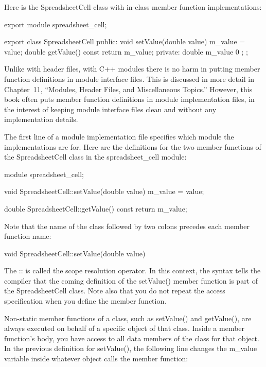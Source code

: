 Here is the SpreadsheetCell class with in-class member function implementations:

\begin{cpp}
export module spreadsheet_cell;

export class SpreadsheetCell
{
    public:
        void setValue(double value) { m_value = value; }
        double getValue() const { return m_value; }
    private:
        double m_value { 0 };
};
\end{cpp}

Unlike with header files, with C++ modules there is no harm in putting member function definitions in module interface files. This is discussed in more detail in Chapter 11, “Modules, Header Files, and Miscellaneous Topics.” However, this book often puts member function definitions in module implementation files, in the interest of keeping module interface files clean and without any implementation details.

The first line of a module implementation file specifies which module the implementations are for. Here are the definitions for the two member functions of the SpreadsheetCell class in the spreadsheet\_cell module:

\begin{cpp}
module spreadsheet_cell;

void SpreadsheetCell::setValue(double value)
{
    m_value = value;
}

double SpreadsheetCell::getValue() const
{
    return m_value;
}

\end{cpp}

Note that the name of the class followed by two colons precedes each member function name:

\begin{cpp}
void SpreadsheetCell::setValue(double value)
\end{cpp}

The :: is called the scope resolution operator. In this context, the syntax tells the compiler that the coming definition of the setValue() member function is part of the SpreadsheetCell class. Note also that you do not repeat the access specification when you define the member function.


Non-static member functions of a class, such as setValue() and getValue(), are always executed on behalf of a specific object of that class. Inside a member function’s body, you have access to all data members of the class for that object. In the previous definition for setValue(), the following line changes the m\_value variable inside whatever object calls the member function:


